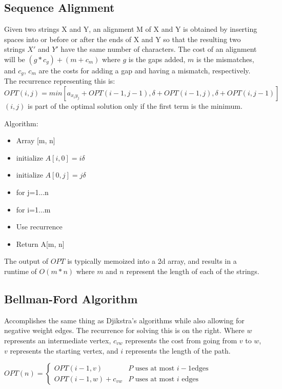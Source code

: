 \documentclass{article}
\begin{document}
\subsection{Sequence Alignment}

\begin{multicols}{2}
Given two strings X and Y, an alignment M of X and Y is obtained by inserting spaces into or
before or after the ends of X and Y so that the resulting two strings $X'$ and $Y'$  have the same number of characters.
The cost of an alignment will be $(g * c_g) + (m + c_m)$ where $g$ is the gaps added, $m$ is the mismatches, and $c_g$, $c_m$
are the costs for adding a gap and having a mismatch, respectively.
The recurrence representing this is: $OPT(i, j) = min[a_{x_iy_j} + OPT(i - 1, j - 1),\delta + OPT(i - 1, j), \delta + OPT(i, j - 1)]$ \\ 
$(i,j)$ is part of the optimal solution only if the first term is the minimum.

\columnbreak

Algorithm:
\begin{itemize}
    \item Array [m, n]
    \item initialize $A[i, 0] = i\delta$
    \item initialize $A[0, j] = j\delta$
    \item for j=1...n
    \item \quad for i=1...m
    \item \quad \quad Use recurrence
    \item Return A[m, n]
\end{itemize}
\end{multicols}

\noindent The output of $OPT$ is typically memoized into a 2d array, and results in a runtime of $O(m * n)$ where $m$ and $n$ represent
the length of each of the strings.

\subsection{Bellman-Ford Algorithm}
\begin{multicols}{2}
Accomplishes the same thing as Djikstra's algorithms while also allowing for negative
weight edges. The recurrence for solving this is on the right.
Where $w$ represents an intermediate vertex, $c_{vw}$ represents the cost from going from $v$ to $w$,
$v$ represents the starting vertex, and $i$ represents the length of the path.
\columnbreak

$OPT(n) = \begin{cases}
    OPT(i-1, v)  & P \text{ uses at most } i-1 \text{edges} \\
    OPT(i-1, w) + c_{vw} & P \text{ uses at most } i \text{ edges}
  \end{cases}$
\end{multicols}
\end{document}
